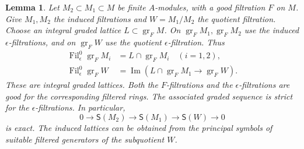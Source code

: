 \documentclass[11pt]{article}
\newtheorem{lemma}[theorem]{Lemma}
\theoremstyle{definition}
\newcommand{\gr}{\operatorname{gr}}
\newcommand{\Fil}{\operatorname{Fil}}
\newcommand{\im}{\operatorname{Im}}
\begin{document}
\begin{lemma}%
\label{lem:two-stage-strictness}
Let $M_2\subset M_1\subset M$ be finite $A$-modules, with a good
filtration $F$ on $M$. Give $M_1,M_2$ the induced filtrations
and $W=M_1/M_2$ the quotient filtration.
Choose an integral graded lattice $L\subset\gr_FM$.
On $\gr_FM_1,\gr_FM_2$ use the induced $\epsilon$-filtrations,
and on $\gr_FW$ use the quotient $\epsilon$-filtration. Thus
\[
 \begin{aligned}
 \Fil_\epsilon^0\gr_FM_i&=L\cap\gr_FM_i\quad(i=1,2),\\
 \Fil_\epsilon^0\gr_FW
 &=\im(L\cap\gr_FM_1\longrightarrow\gr_FW).
 \end{aligned}
\]
These are integral graded lattices. Both the $F$-filtrations and
the $\epsilon$-filtrations are good for the corresponding filtered rings.
The associated graded sequence is strict for the $\epsilon$-filtrations.
In particular,
\[
 0\longrightarrow\mathsf S(M_2)
 \longrightarrow\mathsf S(M_1)
 \longrightarrow\mathsf S(W)\longrightarrow0
\]
is exact. The induced lattices can be obtained from the principal symbols of suitable
filtered generators of the subquotient $W$.
\end{lemma}
\end{document}

